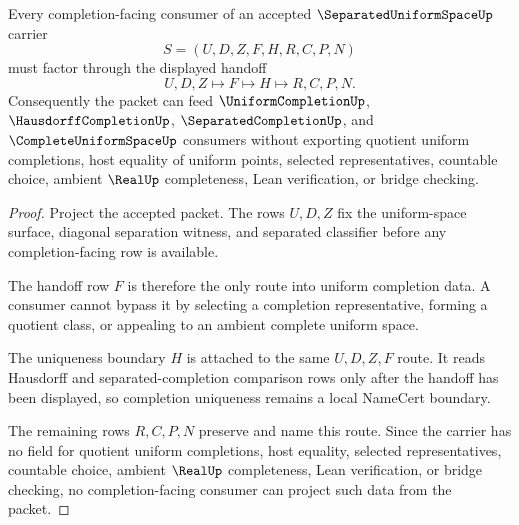 \begin{theorem}
\label{thm:separated-uniform-space-completion-nonescape}
Every completion-facing consumer of an accepted $\SeparatedUniformSpaceUp$ carrier
$$
S=(U,D,Z,F,H,R,C,P,N)
$$
must factor through the displayed handoff
$$
U,D,Z\longmapsto F\longmapsto H\longmapsto R,C,P,N .
$$
Consequently the packet can feed $\UniformCompletionUp$, $\HausdorffCompletionUp$, $\SeparatedCompletionUp$, and $\CompleteUniformSpaceUp$ consumers without exporting quotient uniform completions, host equality of uniform points, selected representatives, countable choice, ambient $\RealUp$ completeness, Lean verification, or bridge checking.
\end{theorem}
\begin{proof}
Project the accepted packet. The rows $U,D,Z$ fix the uniform-space surface, diagonal separation witness, and separated classifier before any completion-facing row is available.

The handoff row $F$ is therefore the only route into uniform completion data. A consumer cannot bypass it by selecting a completion representative, forming a quotient class, or appealing to an ambient complete uniform space.

The uniqueness boundary $H$ is attached to the same $U,D,Z,F$ route. It reads Hausdorff and separated-completion comparison rows only after the handoff has been displayed, so completion uniqueness remains a local NameCert boundary.

The remaining rows $R,C,P,N$ preserve and name this route. Since the carrier has no field for quotient uniform completions, host equality, selected representatives, countable choice, ambient $\RealUp$ completeness, Lean verification, or bridge checking, no completion-facing consumer can project such data from the packet.
\end{proof}

